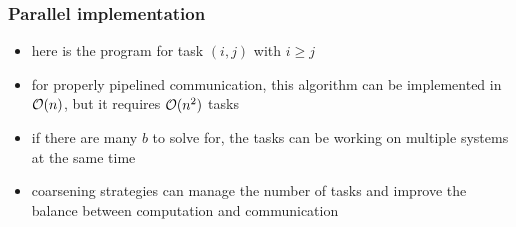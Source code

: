 \begin{frame}[fragile]
%
  \frametitle{Parallel implementation}
%
  \begin{itemize}
  \item here is the program for task $(i,j)$ with $i \geq j$
%
  \begin{center}
    \footnotesize
    \begin{minipage}{.85\linewidth}
      \begin{algorithm}[H]
%
        \dontprintsemicolon
        \nocaptionofalgo
        \setalcaphskip{0ex}
%
         
% 
      \end{algorithm}
    \end{minipage}
  \end{center}
%
  \item for properly pipelined communication, this algorithm can be implemented in $\mbox{$\mathcal{O}(n)$}$,
    but it requires $\mbox{$\mathcal{O}(n^{2})$}$ tasks
  \item if there are many $b$ to solve for, the tasks can be working on multiple systems at
    the same time
  \item coarsening strategies can manage the number of tasks and improve the balance between
    computation and communication
  \end{itemize}
%
\end{frame}

